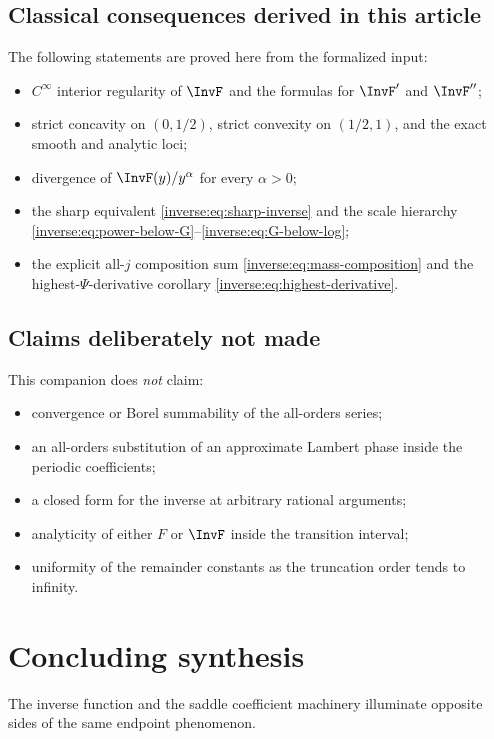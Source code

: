 \documentclass[11pt,oneside]{article}
\theoremstyle{definition}
\theoremstyle{remark}
\begin{document}
\subsection{Classical consequences derived in this article}

The following statements are proved here from the formalized input:
\begin{itemize}
\item $C^\infty$ interior regularity of $\InvF$ and the formulas for
$\InvF'$ and $\InvF''$;
\item strict concavity on $(0,1/2)$, strict convexity on $(1/2,1)$,
and the exact smooth and analytic loci;
\item divergence of $\InvF(y)/y^\alpha$ for every $\alpha>0$;
\item the sharp equivalent \eqref{inverse:eq:sharp-inverse} and the scale
hierarchy \eqref{inverse:eq:power-below-G}--\eqref{inverse:eq:G-below-log};
\item the explicit all-$j$ composition sum \eqref{inverse:eq:mass-composition}
and the highest-$\Psi$-derivative corollary
\eqref{inverse:eq:highest-derivative}.
\end{itemize}

\subsection{Claims deliberately not made}

This companion does \emph{not} claim:
\begin{itemize}
\item convergence or Borel summability of the all-orders series;
\item an all-orders substitution of an approximate Lambert phase inside
the periodic coefficients;
\item a closed form for the inverse at arbitrary rational arguments;
\item analyticity of either $F$ or $\InvF$ inside the transition interval;
\item uniformity of the remainder constants as the truncation order tends
to infinity.
\end{itemize}

\section{Concluding synthesis}

The inverse function and the saddle coefficient machinery illuminate
opposite sides of the same endpoint phenomenon.
\end{document}

